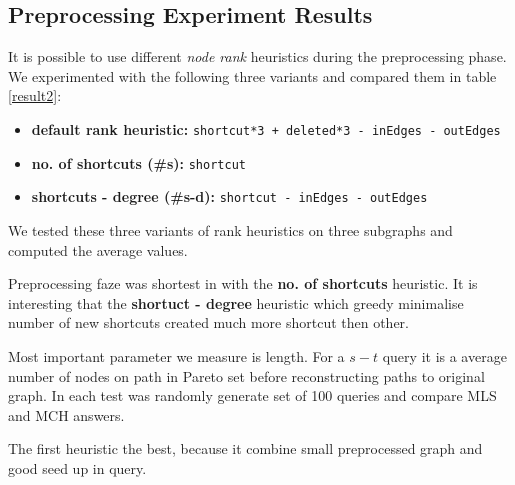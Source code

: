 \subsection{Preprocessing Experiment Results}

It is possible to use different {\em node rank} heuristics during the
preprocessing phase. We experimented with the following three variants 
and compared them in table \ref{result2}:

\begin{itemize}
    \item {\bf default rank heuristic:} {\tt shortcut*3 + deleted*3 -~inEdges -~outEdges} 
    \item {\bf no. of shortcuts (\#s):} {\tt shortcut} 
    \item {\bf shortcuts - degree (\#s-d):} {\tt shortcut -~inEdges -~outEdges} 
\end{itemize}

We tested these three variants of rank heuristics on three 
subgraphs and computed the average values.

Preprocessing faze was shortest in with the {\bf no. of shortcuts} heuristic. 
It is interesting that the {\bf shortuct - degree} heuristic which greedy minimalise 
number of new shortcuts created much more shortcut then other.

Most important parameter we measure is length. 
For a $s-t$ query it is a average number of nodes on path in Pareto set before reconstructing
paths to original graph.
In each test was randomly generate set of 100 queries and compare MLS and MCH answers.

The first heuristic the best, because it combine small preprocessed graph
and good seed up in query.


